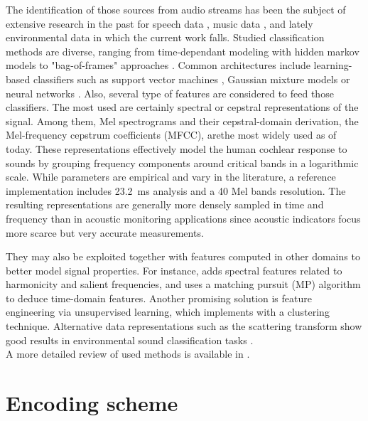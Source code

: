 \documentclass[sensors,article,submit,moreauthors,pdftex,10pt,a4paper]{mdpi}
\begin{document}
The identification of those sources from audio streams has been the subject of extensive research in the past for speech data \cite{anusuya2009}, music data \cite{tzanetakis2002}, and lately environmental data in which the current work falls. Studied classification methods are diverse, ranging from time-dependant modeling with hidden markov models \cite{ntalampiras2014} to "bag-of-frames" approaches \cite{aucouturier2007, foggia2015}. Common architectures include learning-based classifiers such as support vector machines \cite{kumar2016}, Gaussian mixture models \cite{radhakrishnan2005} or neural networks \cite{salamon2017, piczak2015}. Also, several type of features are considered to feed those classifiers. The most used are certainly spectral \cite{khunarsal2013} or cepstral \cite{couvreur2004} representations of the signal. Among them, Mel spectrograms and their cepstral-domain derivation, the Mel-frequency cepstrum coefficients (MFCC), arethe most widely used as of today. These representations effectively model the human cochlear response to sounds by grouping frequency components around critical bands in a logarithmic scale. While parameters are empirical and vary in the literature, a reference implementation includes 23.2~ms analysis and a 40 Mel bands resolution. The resulting representations are generally more densely sampled in time and frequency than in acoustic monitoring applications since acoustic indicators focus more scarce but very accurate measurements.

They may also be exploited together with features computed in other domains to better model signal properties. For instance, \cite{cai2006} adds spectral features related to harmonicity and salient frequencies, and \cite{chu2009} uses a matching pursuit (MP) algorithm to deduce time-domain features. Another promising solution is feature engineering via unsupervised learning, which \cite{salamon2015-2} implements with a clustering technique. Alternative data representations such as the scattering transform \cite{bauge2013} show good results in environmental sound classification tasks \cite{salamon2015}.\\
A more detailed review of used methods is available in \cite{chachada2013}.

\section{Encoding scheme} \label{sec:coder}
\end{document}

